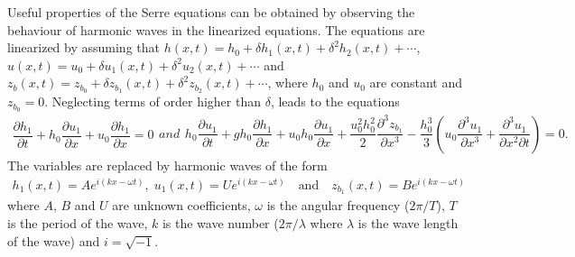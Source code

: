 \documentclass[preprint,sort&compress,1p]{article}
\begin{document}
Useful properties of the Serre equations can be obtained by observing the behaviour of harmonic waves in the linearized equations. The equations are linearized by assuming that $h(x,t) = h_0 + \delta h_1(x,t) + \delta^2 h_2(x,t) + \cdots$, $u(x,t) = u_0 + \delta u_1(x,t) + \delta^2 u_2(x,t) + \cdots$ and $z_b(x,t) = z_{b_0} + \delta z_{b_1}(x,t) + \delta^2 z_{b_2}(x,t) + \cdots$, where $h_0$ and $u_0$ are constant  and $z_{b_0}=0$. Neglecting terms of order higher than $\delta$,  leads  to the equations
\begin{subequations}
\label{eq:linearized_Serre}
\begin{gather}
\label{eq:linearized_Serre_continuity}
\dfrac{\partial h_1}{\partial  t} + h_0 \dfrac{\partial u_1}{\partial x} +  u_0 \dfrac{\partial h_1}{\partial x} = 0
\end{gather}
and
\begin{gather}\label{eq:linearized_Serre_momentum}
h_0 \dfrac{\partial u_1}{\partial t} +  g h_0 \dfrac{\partial h_1}{\partial x} + u_0 h_0 \dfrac{\partial u_1}{\partial x} + \dfrac{u_0^2 h_0^2}{2} \dfrac{\partial^3z_{b_1}}{\partial x^3} -  \dfrac{h_0^3}{3} \left ( u_0 \dfrac{\partial^3 u_1}{\partial x^3}  + \dfrac{\partial^3 u_1}{\partial x^2 \partial t} \right )  = 0 .
\end{gather}
\end{subequations}
The variables are replaced by harmonic waves of the form
\begin{gather}
\label{eq:Fourier_components}
h_1(x,t) = A e^{i(kx - \omega t)}, \; u_1(x,t) = U e^{i(kx - \omega t)} \quad \text{and} \quad z_{b_1}(x,t) = B e^{i(kx - \omega t)}
\end{gather}
where $A$, $B$ and $U$ are unknown coefficients, $\omega$ is the angular frequency ($2\pi/T$), $T$ is the period of the wave, $k$  is the  wave number ($2\pi/\lambda$ where $\lambda$ is the wave length of the wave) and $i = \sqrt{-1}$.
\end{document}
